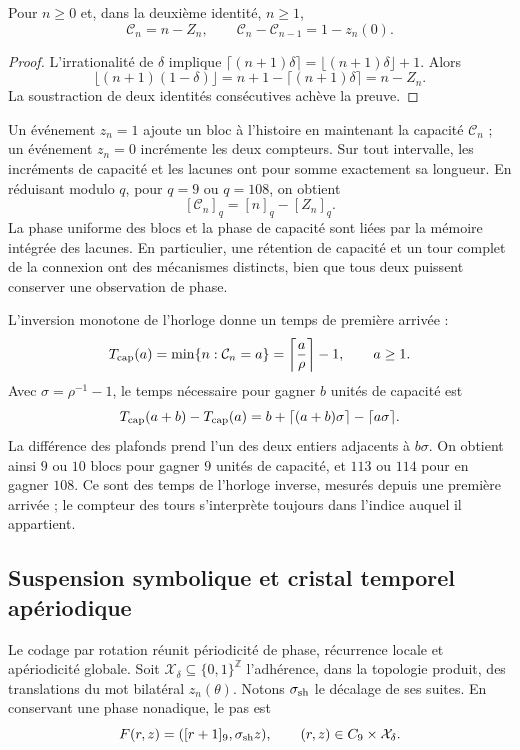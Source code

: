 \begin{proposition}
\label{mono-ampl:balance-capacidad}
Pour \(n\geq0\) et, dans la deuxième identité, \(n\geq1\),
\[
 \mathcal C_n=n-Z_n,\qquad
 \mathcal C_n-\mathcal C_{n-1}=1-z_n(0).
\]
\end{proposition}
\begin{proof}
L'irrationalité de \(\delta\) implique
\(\lceil(n+1)\delta\rceil=\lfloor(n+1)\delta\rfloor+1\).
Alors
\[
 \lfloor(n+1)(1-\delta)\rfloor
 =n+1-\lceil(n+1)\delta\rceil=n-Z_n.
\]
La soustraction de deux identités consécutives achève la preuve.
\end{proof}

Un événement \(z_n=1\) ajoute un bloc à l'histoire en maintenant la capacité
\(\mathcal C_n\) ; un événement \(z_n=0\) incrémente les deux compteurs. Sur
tout intervalle, les incréments de capacité et les lacunes ont pour somme
exactement sa longueur. En réduisant modulo \(q\), pour \(q=9\) ou
\(q=108\), on obtient
\[
 [\mathcal C_n]_q=[n]_q-[Z_n]_q.
\]
La phase uniforme des blocs et la phase de capacité sont liées par
la mémoire intégrée des lacunes. En particulier, une rétention de
capacité et un tour complet de la connexion ont des mécanismes
distincts, bien que tous deux puissent conserver une observation de phase.

L'inversion monotone de l'horloge donne un temps de première arrivée :
\[
 T_{\rm cap}(a)=\min\{n:\mathcal C_n=a\}
 =\left\lceil\frac a\rho\right\rceil-1,
 \qquad a\geq1.
\]
Avec \(\sigma=\rho^{-1}-1\), le temps nécessaire pour gagner \(b\) unités
de capacité est
\[
 T_{\rm cap}(a+b)-T_{\rm cap}(a)
 =b+\lceil(a+b)\sigma\rceil-\lceil a\sigma\rceil.
\]
La différence des plafonds prend l'un des deux entiers adjacents à
\(b\sigma\). On obtient ainsi \(9\) ou \(10\) blocs pour gagner
\(9\) unités de capacité, et \(113\) ou \(114\) pour en gagner \(108\).
Ce sont des temps de l'horloge inverse, mesurés depuis une première arrivée ; le
compteur des tours s'interprète toujours dans l'indice auquel il appartient.

\subsection{Suspension symbolique et cristal temporel apériodique}
\label{mono-ampl:cristal}

Le codage par rotation réunit périodicité de phase, récurrence locale
et apériodicité globale. Soit \(\mathcal X_\delta\subseteq\{0,1\}^{\mathbb Z}\)
l'adhérence, dans la topologie produit, des translations du mot
bilatéral \(z_n(\theta)\). Notons \(\sigma_{\rm sh}\) le
décalage de ses suites. En conservant une phase nonadique, le pas est
\[
 F(r,z)=([r+1]_9,\sigma_{\rm sh}z),\qquad
 (r,z)\in C_9\times\mathcal X_\delta.
\]

